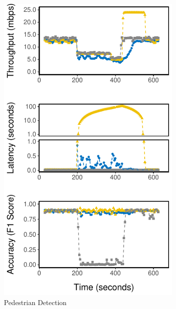 \begin{figure}
  \begin{subfigure}{0.33\textwidth}
    \centering
    \includegraphics[width=\textwidth]{figures/runtime-mot-verticle.pdf}
    \caption{Pedestrian Detection}
    \label{fig:pd-runtime}
  \end{subfigure}
  \hfill
  \begin{subfigure}{0.33\textwidth}
    \centering

\end{subfigure}
\end{figure}
